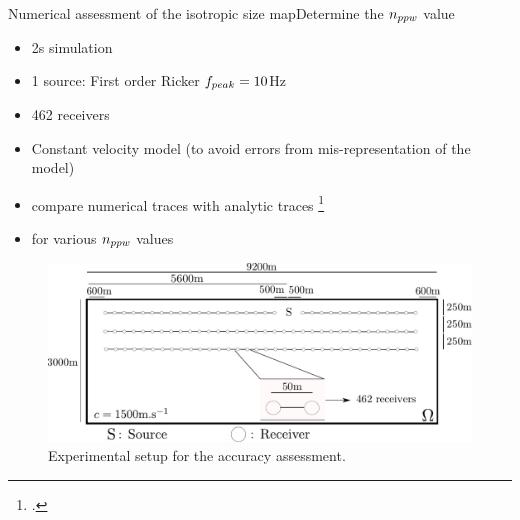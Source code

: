 \begin{frame}{Numerical assessment of the isotropic size map}{Determine the $n_{ppw}$ value}
  \begin{multicols}{2}
    \begin{itemize}
    \item 2s simulation
    \item 1 source: First order Ricker ${f_{peak}}=10$Hz
    \item 462 receivers
    \item Constant velocity model (to avoid errors from mis-representation of the model)
    \item compare numerical traces with analytic traces \footcite{gar6more}
    \item for various $n_{ppw}$ values
    \end{itemize}
    \columnbreak
  \begin{figure}[H]
  \centering
  \includegraphics[scale=0.31]{image/precision_test.pdf}
  \caption*{Experimental setup for the accuracy assessment.}
  \label{homogeneous_prec}
  \end{figure}
  \end{multicols}
  \end{frame}



